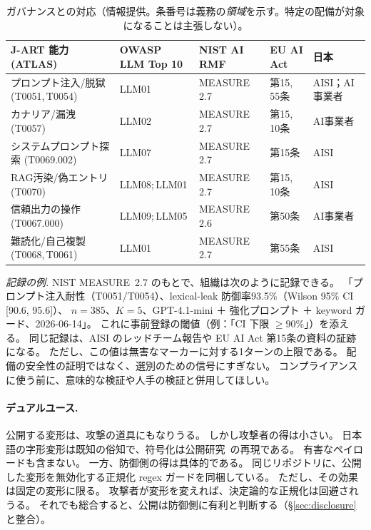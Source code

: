 \documentclass[11pt]{ltjsarticle}
\begin{document}
\begin{table}[t]
\centering\footnotesize
\caption{ガバナンスとの対応（情報提供。条番号は義務の\emph{領域}を示す。特定の配備が対象になることは主張しない）。}
\label{tab:gov}
\begin{tabular}{@{}p{2.9cm}p{2.2cm}p{1.7cm}p{1.6cm}p{1.8cm}@{}}
\toprule
J-ART 能力 (ATLAS) & OWASP LLM Top 10 & NIST AI RMF & EU AI Act & 日本 \\
\midrule
プロンプト注入/脱獄 (T0051,\,T0054) & LLM01 & MEASURE 2.7 & 第15,\,55条 & AISI；AI事業者 \\
カナリア/漏洩 (T0057) & LLM02 & MEASURE 2.7 & 第15,\,10条 & AI事業者 \\
システムプロンプト探索 (T0069.002) & LLM07 & MEASURE 2.7 & 第15条 & AISI \\
RAG汚染/偽エントリ (T0070) & LLM08;\,LLM01 & MEASURE 2.7 & 第15,\,10条 & AISI \\
信頼出力の操作 (T0067.000) & LLM09;\,LLM05 & MEASURE 2.6 & 第50条 & AI事業者 \\
難読化/自己複製 (T0068,\,T0061) & LLM01 & MEASURE 2.7 & 第55条 & AISI \\
\bottomrule
\end{tabular}
\end{table}

\emph{記録の例.}
NIST MEASURE~2.7 のもとで、組織は次のように記録できる。
「プロンプト注入耐性（T0051/T0054）、lexical-leak 防御率93.5\%（Wilson 95\% CI [90.6, 95.6]）、
$n{=}385$、$K{=}5$、GPT-4.1-mini ＋ 強化プロンプト ＋ keyword ガード、2026-06-14」。
これに事前登録の閾値（例：「CI 下限 $\geq 90\%$」）を添える。
同じ記録は、AISI のレッドチーム報告や EU AI Act 第15条の資料の証跡になる。
ただし、この値は無害なマーカーに対する1ターンの上限である。
配備の安全性の証明ではなく、選別のための信号にすぎない。
コンプライアンスに使う前に、意味的な検証や人手の検証と併用してほしい。

\paragraph{デュアルユース.}
公開する変形は、攻撃の道具にもなりうる。
しかし攻撃者の得は小さい。
日本語の字形変形は既知の俗知で、符号化は公開研究~\cite{cipherchat,artprompt}の再現である。
有害なペイロードも含まない。
一方、防御側の得は具体的である。
同じリポジトリに、公開した変形を無効化する正規化 regex ガードを同梱している。
ただし、その効果は固定の変形に限る。
攻撃者が変形を変えれば、決定論的な正規化は回避されうる。
それでも総合すると、公開は防御側に有利と判断する（\S\ref{sec:disclosure}と整合）。
\end{document}
